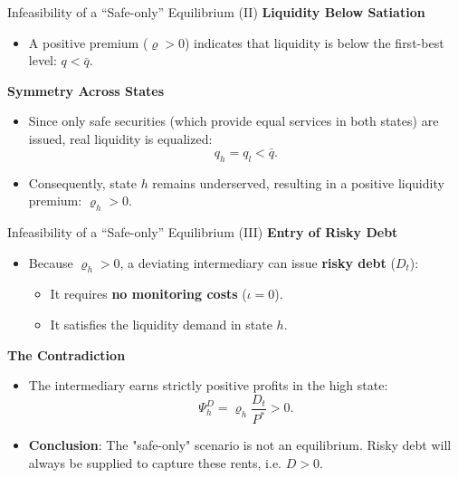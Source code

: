 \documentclass[11pt,aspectratio=169]{beamer}
\begin{document}
\begin{frame}{Infeasibility of a ``Safe-only'' Equilibrium (II)}
\small
\textbf{Liquidity Below Satiation}
\begin{itemize}
    \item A positive premium ($\varrho > 0$) indicates that liquidity is below the first-best level: $q < \bar{q}$.
\end{itemize}

\vspace{0.3cm}
\textbf{Symmetry Across States}
\begin{itemize}
    \item Since only safe securities (which provide equal services in both states) are issued, real liquidity is equalized:
    \begin{equation}
    q_h = q_l < \bar{q}.
    \end{equation}
    \item Consequently, state $h$ remains underserved, resulting in a positive liquidity premium: $\varrho_h > 0$.
\end{itemize}
\end{frame}

\begin{frame}{Infeasibility of a ``Safe-only'' Equilibrium (III)}
\small
\textbf{Entry of Risky Debt}
\begin{itemize}
    \item Because $\varrho_h > 0$, a deviating intermediary can issue \textbf{risky debt} ($D_t$):
    \begin{itemize}
        \item It requires \textbf{no monitoring costs} ($\iota = 0$).
        \item It satisfies the liquidity demand in state $h$.
    \end{itemize}
\end{itemize}

\vspace{0.3cm}
\textbf{The Contradiction}
\begin{itemize}
    \item The intermediary earns strictly positive profits in the high state:
    \begin{equation}
    \Psi_h^D = \varrho_h \frac{D_t}{P^*} > 0.
    \end{equation}
    \item \textbf{Conclusion}: The "safe-only" scenario is not an equilibrium. Risky debt will always be supplied to capture these rents, i.e. $D > 0$.
\end{itemize}
\end{frame}
\end{document}
